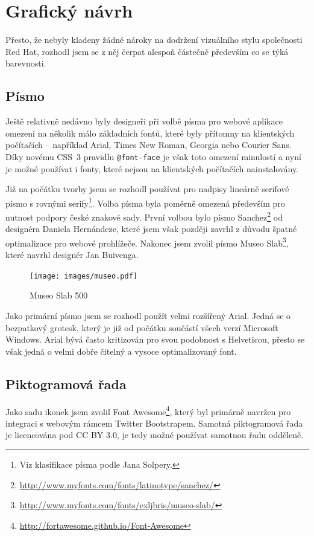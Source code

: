 \section{Grafický návrh}

Přesto, že nebyly kladeny žádné nároky na dodržení vizuálního stylu společnosti Red Hat, rozhodl jsem se z něj čerpat alespoň částečně především co se týká barevnosti.

\subsection{Písmo}

Ještě relativně nedávno byly designeři při volbě písma pro webové aplikace omezeni na několik málo základních fontů, které byly přítomny na klientských počítačích -- například Arial, Times New Roman, Georgia nebo Courier Sans. Díky novému CSS~3 pravidlu \texttt{@font-face} je však toto omezení minulostí a nyní je možné používat i fonty, které nejsou na klientských počítačích nainstalovány.

Již na počátku tvorby jsem se rozhodl používat pro nadpisy lineárně serifové písmo s rovnými serify\footnote{Viz klasifikace písma podle Jana Solpery.}. Volba písma byla poměrně omezená především pro nutnost podpory české znakové sady. První volbou bylo písmo Sanchez\footnote{\url{http://www.myfonts.com/fonts/latinotype/sanchez/}} od designéra Daniela Hernándeze, které jsem však později zavrhl z důvodu špatné optimalizace pro webové prohlížeče. Nakonec jsem zvolil písmo Museo Slab\footnote{\url{http://www.myfonts.com/fonts/exljbris/museo-slab/}}, které navrhl designér Jan Buivenga.

\begin{figure}[htbp]
    \centering
    \texttt{[image: images/museo.pdf]}
    \caption{Museo Slab 500}
    \label{img:museo}
\end{figure}

Jako primární písmo jsem se rozhodl použít velmi rozšířený Arial. Jedná se o bezpatkový grotesk, který je již od počátku součástí všech verzí Microsoft Windows. Arial bývá často kritizován pro svou podobnost s Helveticou, přesto se však jedná o velmi dobře čitelný a vysoce optimalizovaný font.

\subsection{Piktogramová řada}

Jako sadu ikonek jsem zvolil Font Awesome\footnote{\url{http://fortawesome.github.io/Font-Awesome}}, který byl primárně navržen pro integraci s webovým rámcem Twitter Bootstrapem. Samotná piktogramová řada je licencována pod CC BY 3.0, je tedy možné používat samotnou řadu odděleně.

